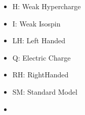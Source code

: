 \begin{itemize}
\item{H: Weak Hypercharge}
\item{ I: Weak Isospin}
\item{LH:  Left Handed}
\item{Q: Electric Charge}
\item{RH: RightHanded}
\item{SM: Standard Model}
\item{}
\end{itemize}